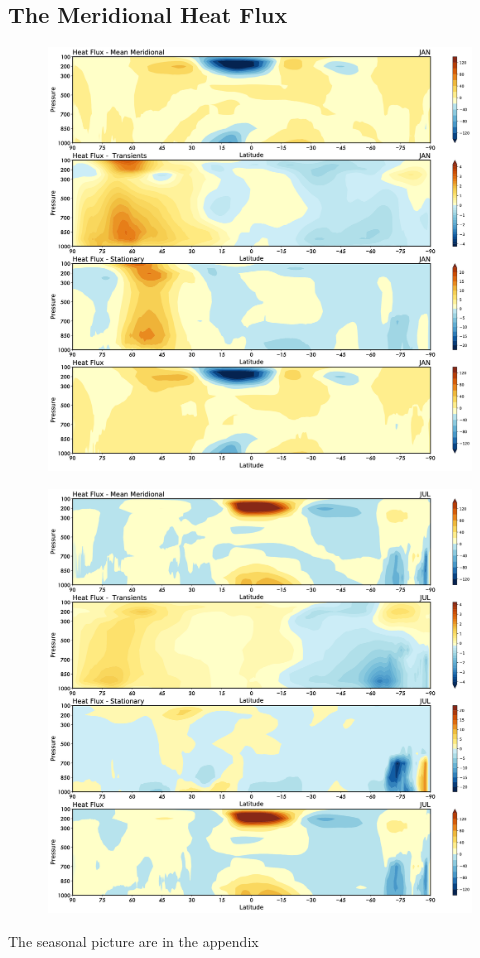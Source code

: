 \subsection{The Meridional Heat Flux}\label{the-meridional-heat-flux}

\begin{figure}
\centering
\includegraphics[width = .7 \textwidth]{figs/GD/JANTVFlux.png}
\caption{}\label{}
\end{figure}

\begin{figure}
\centering
\includegraphics[width = .7 \textwidth]{figs/GD/JULTVFlux.png}
\caption{}\label{}
\end{figure}

The seasonal picture are in the appendix

